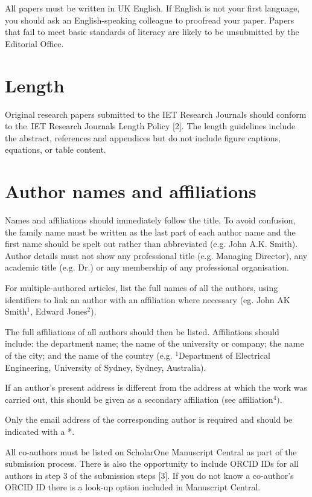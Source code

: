 \documentclass{cta-author}
\begin{document}
All papers must be written in UK English. If English is not
your first language, you should ask an English-speaking
colleague to proofread your paper. Papers that fail to meet
basic standards of literacy are likely to be unsubmitted by
the Editorial Office.

\section{Length}\label{sec3}

Original research papers submitted to the IET Research
Journals should conform to the~IET Research Journals Length
Policy [2]. The length guidelines include the
abstract, references and appendices but do not include
figure captions, equations, or table content.

\section{Author names and affiliations}\label{sec4}

Names and affiliations should immediately follow the title.
To avoid confusion, the family name must be written as the
last part of each author name and the first name should be
spelt out rather than abbreviated (e.g. John A.K. Smith).
Author details must not show any professional title (e.g.
Managing Director), any academic title (e.g. Dr.) or any
membership of any professional organisation.

For multiple-authored articles, list the full names of all
the authors, using identifiers to link an author with an
affiliation where necessary (eg. John AK Smith$^{1}$,
Edward Jones$^{2}$).

The full affiliations of all authors should then be listed.
Affiliations should include: the department name; the name
of the university or company; the name of the city; and the
name of the country (e.g. $^{1}$Department of Electrical
Engineering, University of Sydney, Sydney, Australia).

If an author's present address is different from the
address at which the work was carried out, this should be
given as a secondary affiliation (see affiliation$^{4})$.

Only the email address of the corresponding author is
required and should be indicated with a *.

All co-authors must be listed on ScholarOne Manuscript
Central as part of the submission process. There is also
the opportunity to include ORCID IDs for all authors in
step 3 of the submission steps [3]. If you do not know
a co-author's ORCID ID there is a look-up option included
in Manuscript Central.
\end{document}
